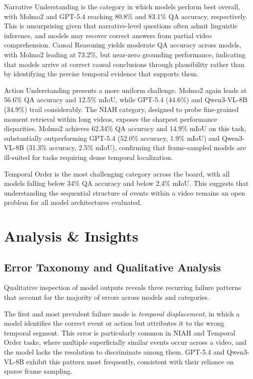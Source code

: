 \documentclass[sigconf,natbib=false,nonacm]{acmart}
\begin{document}
Narrative Understanding is the category in which models perform best overall, with Molmo2 and GPT-5.4 reaching 80.8\% and 83.1\% QA accuracy, respectively. This is unsurprising given that narrative-level questions often admit linguistic inference, and models may recover correct answers from partial video comprehension. Causal Reasoning yields moderate QA accuracy across models, with Molmo2 leading at 73.2\%, but near-zero grounding performance, indicating that models arrive at correct causal conclusions through plausibility rather than by identifying the precise temporal evidence that supports them.

Action Understanding presents a more uniform challenge. Molmo2 again leads at 56.6\% QA accuracy and 12.5\% mIoU, while GPT-5.4 (44.6\%) and Qwen3-VL-8B (34.9\%) trail considerably. The NIAH category, designed to probe fine-grained moment retrieval within long videos, exposes the sharpest performance disparities. Molmo2 achieves 62.34\% QA accuracy and 14.9\% mIoU on this task, substantially outperforming GPT-5.4 (52.0\% accuracy, 1.9\% mIoU) and Qwen3-VL-8B (31.3\% accuracy, 2.5\% mIoU), confirming that frame-sampled models are ill-suited for tasks requiring dense temporal localization.

Temporal Order is the most challenging category across the board, with all models falling below 34\% QA accuracy and below 2.4\% mIoU. This suggests that understanding the sequential structure of events within a video remains an open problem for all model architectures evaluated.

\section{Analysis \& Insights}

\subsection{Error Taxonomy and Qualitative Analysis}
Qualitative inspection of model outputs reveals three recurring failure patterns that account for the majority of errors across models and categories.

The first and most prevalent failure mode is \textit{temporal displacement}, in which a model identifies the correct event or action but attributes it to the wrong temporal segment. This error is particularly common in NIAH and Temporal Order tasks, where multiple superficially similar events occur across a video, and the model lacks the resolution to discriminate among them. GPT-5.4 and Qwen3-VL-8B exhibit this pattern most frequently, consistent with their reliance on sparse frame sampling.
\end{document}

